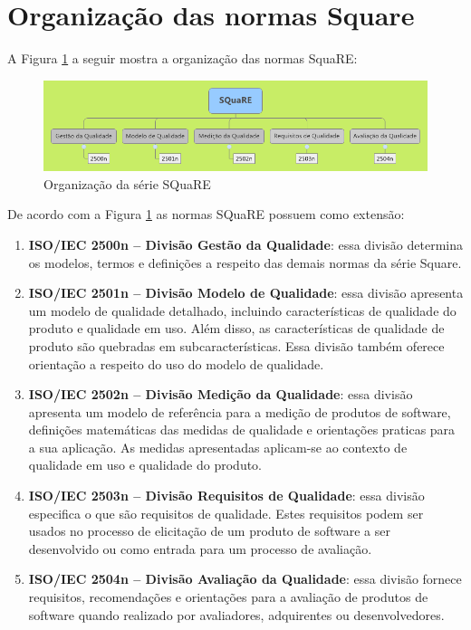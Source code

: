\section{Organização das normas Square}

A Figura \ref{Org_SQuaRE} a seguir mostra a organização das normas SquaRE:

\begin{figure}[!ht]
\centering
\includegraphics[keepaspectratio=true,scale=0.5]{figuras/SQuaRE.png}
\caption{Organização da série SQuaRE \cite{iso_25000}}
\label{Org_SQuaRE}
\end{figure} 

De acordo com a Figura \ref{Org_SQuaRE} as normas SQuaRE possuem como extensão:

\begin{enumerate}
\item \textbf{ISO/IEC 2500n – Divisão Gestão da Qualidade}: essa divisão determina os modelos, termos e definições a respeito das demais normas da série Square.

\item \textbf{ISO/IEC 2501n – Divisão Modelo de Qualidade}: essa divisão apresenta um modelo de qualidade detalhado, incluindo características de qualidade do produto e qualidade em uso. Além disso, as características de qualidade de produto são quebradas em subcaracterísticas. Essa divisão também oferece orientação a respeito do uso do modelo de qualidade.

\item \textbf{ISO/IEC 2502n – Divisão Medição da Qualidade}: essa divisão apresenta um modelo de referência para a medição de produtos de software, definições matemáticas das medidas de qualidade e orientações praticas para a sua aplicação. As medidas apresentadas aplicam-se ao contexto de qualidade em uso e qualidade do produto.

\item \textbf{ISO/IEC 2503n – Divisão Requisitos de Qualidade}: essa divisão especifica o que são requisitos de qualidade. Estes requisitos podem ser usados no processo de elicitação de um produto de software a ser desenvolvido ou como entrada para um processo de avaliação.

\item \textbf{ISO/IEC 2504n – Divisão Avaliação da Qualidade}: essa divisão fornece requisitos, recomendações e orientações para a avaliação de produtos de software quando realizado por avaliadores, adquirentes ou desenvolvedores.

\end{enumerate}

